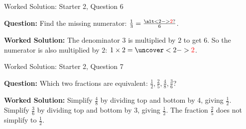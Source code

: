 \documentclass{beamer}
\newcommand{\ashow}[1]{\uncover<2->{\textcolor{red}{\small #1}}}
\newcommand{\ashowq}[1]{\alt<2->{\textcolor{red}{\small #1}}{?}}
\begin{document}
\begin{frame}{Worked Solution: Starter 2, Question 6}

\textbf{Question:} Find the missing numerator: $\frac{1}{3} = \frac{\ashowq{2}}{6}$.

\textbf{Worked Solution:} The denominator $3$ is multiplied by $2$ to get $6$. So the numerator is also multiplied by $2$: $1 \times 2 = \ashow{2}$. \ashow{The missing numerator is 2.}
\end{frame}

\begin{frame}{Worked Solution: Starter 2, Question 7}

\textbf{Question:} Which two fractions are equivalent: $\frac{1}{2}, \frac{2}{5}, \frac{4}{8}, \frac{3}{6}$?

\textbf{Worked Solution:} Simplify $\frac{4}{8}$ by dividing top and bottom by 4, giving $\frac12$. Simplify $\frac{3}{6}$ by dividing top and bottom by 3, giving $\frac12$. The fraction $\frac25$ does not simplify to $\frac12$. \ashow{$\frac{1}{2}=\frac{4}{8}=\frac{3}{6}$.}
\end{frame}
\end{document}
